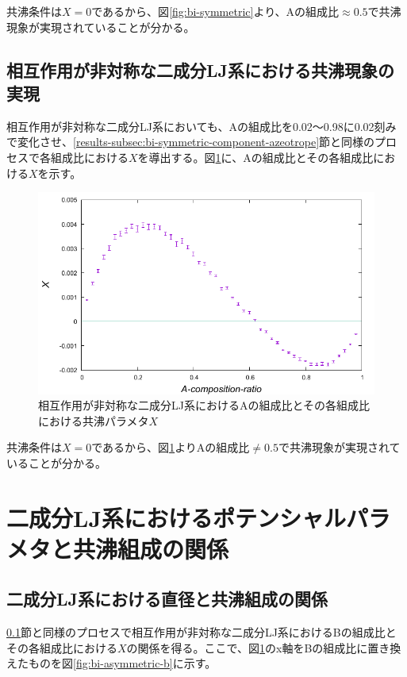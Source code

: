 \documentclass[titlepage]{jsreport}
\begin{document}
\newpage
共沸条件は$X=0$であるから、図\ref{fig:bi-symmetric}より、Aの組成比$\approx0.5$で共沸現象が実現されていることが分かる。


\subsection{相互作用が非対称な二成分LJ系における共沸現象の実現} \label{results-subsec:bi-asymmetric-component-azeotrope}
相互作用が非対称な二成分LJ系においても、Aの組成比を0.02〜0.98に0.02刻みで変化させ、\ref{results-subsec:bi-symmetric-component-azeotrope}節と同様のプロセスで各組成比における$X$を導出する。図\ref{fig:bi-asymmetric}に、Aの組成比とその各組成比における$X$を示す。

\begin{figure}[htbp]
    \begin{center}
        \includegraphics[width=14cm]{fig/bi-asymmetric/L100T1.0E1.05.pdf}
    \end{center}
    \caption{相互作用が非対称な二成分LJ系におけるAの組成比とその各組成比における共沸パラメタ$X$}
    \label{fig:bi-asymmetric}
\end{figure}

\newpage
共沸条件は$X=0$であるから、図\ref{fig:bi-asymmetric}よりAの組成比$\neq0.5$で共沸現象が実現されていることが分かる。

\section{二成分LJ系におけるポテンシャルパラメタと共沸組成の関係} \label{results-sec:bi-component-potential-parameter-azeotrope-ratio}
\subsection{二成分LJ系における直径と共沸組成の関係} \label{results-subsec:bi-component-sigma-azeotrope-ratio}
\ref{results-subsec:bi-asymmetric-component-azeotrope}節と同様のプロセスで相互作用が非対称な二成分LJ系におけるBの組成比とその各組成比における$X$の関係を得る。ここで、図\ref{fig:bi-asymmetric}のx軸をBの組成比に置き換えたものを図\ref{fig:bi-asymmetric-b}に示す。
\end{document}
